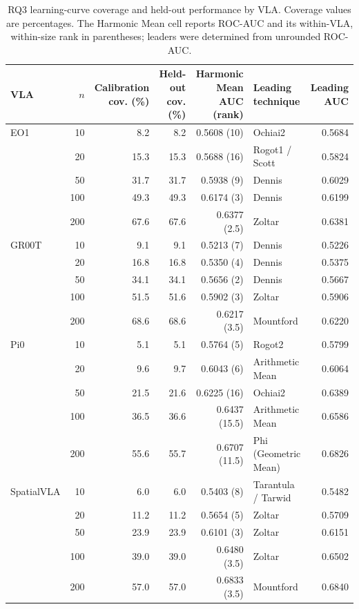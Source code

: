 \begin{table}[t]
\centering
\caption{RQ3 learning-curve coverage and held-out performance by VLA. Coverage values are percentages. The Harmonic Mean cell reports ROC-AUC and its within-VLA, within-size rank in parentheses; leaders were determined from unrounded ROC-AUC.}
\label{tab:rq3v2-coverage-performance}
{\scriptsize
\setlength{\tabcolsep}{4pt}
\begin{tabular}{lrrrrlr}
\toprule
VLA & $n$ & Calibration cov. (\%) & Held-out cov. (\%) & Harmonic Mean AUC (rank) & Leading technique & Leading AUC \\
\midrule
EO1 & 10 & 8.2 & 8.2 & 0.5608 (10) & Ochiai2 & 0.5684 \\
 & 20 & 15.3 & 15.3 & 0.5688 (16) & Rogot1 / Scott & 0.5824 \\
 & 50 & 31.7 & 31.7 & 0.5938 (9) & Dennis & 0.6029 \\
 & 100 & 49.3 & 49.3 & 0.6174 (3) & Dennis & 0.6199 \\
 & 200 & 67.6 & 67.6 & 0.6377 (2.5) & Zoltar & 0.6381 \\
\midrule
GR00T & 10 & 9.1 & 9.1 & 0.5213 (7) & Dennis & 0.5226 \\
 & 20 & 16.8 & 16.8 & 0.5350 (4) & Dennis & 0.5375 \\
 & 50 & 34.1 & 34.1 & 0.5656 (2) & Dennis & 0.5667 \\
 & 100 & 51.5 & 51.6 & 0.5902 (3) & Zoltar & 0.5906 \\
 & 200 & 68.6 & 68.6 & 0.6217 (3.5) & Mountford & 0.6220 \\
\midrule
Pi0 & 10 & 5.1 & 5.1 & 0.5764 (5) & Rogot2 & 0.5799 \\
 & 20 & 9.6 & 9.7 & 0.6043 (6) & Arithmetic Mean & 0.6064 \\
 & 50 & 21.5 & 21.6 & 0.6225 (16) & Ochiai2 & 0.6389 \\
 & 100 & 36.5 & 36.6 & 0.6437 (15.5) & Arithmetic Mean & 0.6586 \\
 & 200 & 55.6 & 55.7 & 0.6707 (11.5) & Phi (Geometric Mean) & 0.6826 \\
\midrule
SpatialVLA & 10 & 6.0 & 6.0 & 0.5403 (8) & Tarantula / Tarwid & 0.5482 \\
 & 20 & 11.2 & 11.2 & 0.5654 (5) & Zoltar & 0.5709 \\
 & 50 & 23.9 & 23.9 & 0.6101 (3) & Zoltar & 0.6151 \\
 & 100 & 39.0 & 39.0 & 0.6480 (3.5) & Zoltar & 0.6502 \\
 & 200 & 57.0 & 57.0 & 0.6833 (3.5) & Mountford & 0.6840 \\
\bottomrule
\end{tabular}
}
\end{table}

